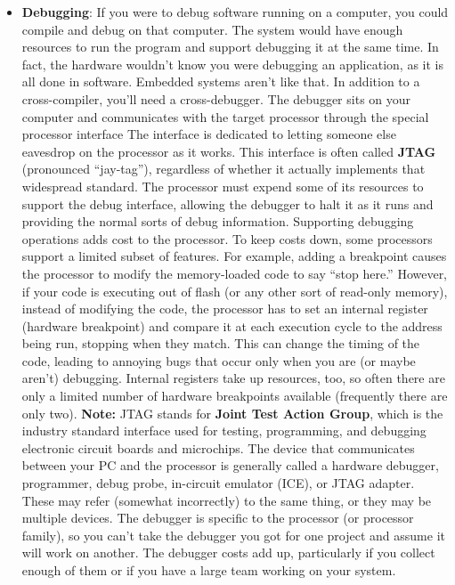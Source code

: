 \documentclass{report}
\begin{document}
\begin{itemize}
        \item \textbf{Debugging}: If you were to debug software running on a computer, you could compile and debug on that computer. The system would have enough resources to run the program and support debugging it at the same time. In fact, the hardware wouldn’t know you were debugging an application, as it is all done in software.
            \bigbreak \noindent 
            Embedded systems aren’t like that. In addition to a cross-compiler, you’ll need a cross-debugger. The debugger sits on your computer and communicates with the target processor through the special processor interface
            \bigbreak \noindent 
            The interface is dedicated to letting someone else eavesdrop on the processor as it works. This interface is often called \textbf{JTAG} (pronounced “jay-tag”), regardless of whether it actually implements that widespread standard.
            \bigbreak \noindent 
            \bigbreak \noindent 
            The processor must expend some of its resources to support the debug interface, allowing the debugger to halt it as it runs and providing the normal sorts of debug information. Supporting debugging operations adds cost to the processor. To keep costs down, some processors support a limited subset of features. For example, adding a breakpoint causes the processor to modify the memory-loaded code to say “stop here.” However, if your code is executing out of flash (or any other sort of read-only memory), instead of modifying the code, the processor has to set an internal register (hardware breakpoint) and compare it at each execution cycle to the address being run, stopping when they match. This can change the timing of the code, leading to annoying bugs that occur only when you are (or maybe aren’t) debugging. Internal registers take up resources, too, so often there are only a limited number of hardware breakpoints available (frequently there are only two).
            \bigbreak \noindent 
            \textbf{Note:} JTAG stands for \textbf{Joint Test Action Group}, which is the industry standard interface used for testing, programming, and debugging electronic circuit boards and microchips.
            \bigbreak \noindent 
            The device that communicates between your PC and the processor is generally called a hardware debugger, programmer, debug probe, in-circuit emulator (ICE), or JTAG adapter. These may refer (somewhat incorrectly) to the same thing, or they may be multiple devices. The debugger is specific to the processor (or processor family), so you can’t take the debugger you got for one project and assume it will work on another. The debugger costs add up, particularly if you collect enough of them or if you have a large team working on your system.

\end{itemize}
\end{document}
